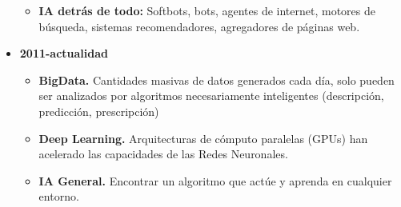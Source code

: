 \documentclass{article}
\begin{document}
\begin{itemize}
\begin{itemize}
\item \textbf{IA detrás de todo:} Softbots, bots, agentes de internet, motores de búsqueda, sistemas recomendadores, agregadores de páginas web.
\end{itemize}

\item \textbf{2011-actualidad}

\begin{itemize}
\item \textbf{BigData.} Cantidades masivas de datos generados cada día, solo pueden ser analizados por algoritmos necesariamente inteligentes (descripción, predicción, prescripción)

\item \textbf{Deep Learning.} Arquitecturas de cómputo paralelas (GPUs) han acelerado las capacidades de las Redes Neuronales.

\item \textbf{IA General.} Encontrar un algoritmo que actúe y aprenda en cualquier entorno.
\end{itemize}

\end{itemize}
\end{document}
